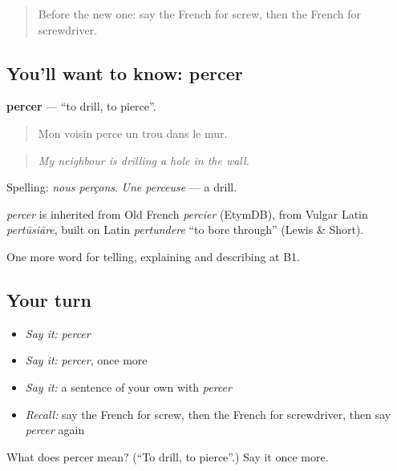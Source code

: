 \begin{quote}
Before the new one: say the French for screw, then the French for screwdriver.
\end{quote}

\subsection*{You'll want to know: percer}
\textbf{percer} — \textquotedblleft{}to drill, to pierce\textquotedblright{}.

\begin{quote}
Mon voisin perce un trou dans le mur.
\end{quote}

\begin{quote}
\emph{My neighbour is drilling a hole in the wall.}
\end{quote}

Spelling: \emph{nous perçons}. \emph{Une perceuse} — a drill.

\begin{cousinweb}
\emph{percer} is inherited from Old French \emph{percier} (EtymDB), from Vulgar Latin \emph{pertūsiāre}, built on Latin \emph{pertundere} \textquotedblleft{}to bore through\textquotedblright{} (Lewis \& Short).
\end{cousinweb}

\begin{grammarlens}[title={What you've built}]
One more word for telling, explaining and describing at B1.
\end{grammarlens}

\subsection*{Your turn}
\begin{itemize}
\raggedright
  \item \emph{Say it:} \emph{percer}
  \item \emph{Say it:} \emph{percer}, once more
  \item \emph{Say it:} a sentence of your own with \emph{percer}
  \item \emph{Recall:} say the French for screw, then the French for screwdriver, then say \emph{percer} again
\end{itemize}

\begin{tcolorbox}[breakable,colback=teal!4,colframe=teal!35!black,title={Before you move on}]
What does percer mean? (\textquotedblleft{}To drill, to pierce\textquotedblright{}.) Say it once more.
\end{tcolorbox}

